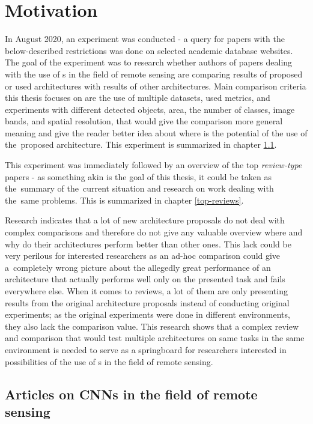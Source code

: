 \chapter{Motivation}
\label{motivation}

In August 2020, an experiment was conducted - a query for papers with the below-described restrictions was done on selected academic database websites. The goal of the experiment was to research whether authors of papers dealing with the use of s in the field of remote sensing are comparing results of proposed or used architectures with results of other architectures. Main comparison criteria this thesis focuses on are the use of multiple datasets, used metrics, and experiments with different detected objects, area, the number of classes, image bands, and spatial resolution, that would give the comparison more general meaning and give the reader better idea about where is the potential of the use of the~proposed architecture. This experiment is summarized in chapter \ref{top-papers}.

This experiment was immediately followed by an overview of the top \textit{review-type} papers - as something akin is the goal of this thesis, it could be taken as the~summary of the~current situation and research on work dealing with the~same problems. This is summarized in chapter \ref{top-reviews}.

Research indicates that a lot of new  architecture proposals do not deal with complex comparisons and therefore do not give any valuable overview where and why do their architectures perform better than other ones. This lack could be very perilous for interested researchers as an ad-hoc comparison could give a~completely wrong picture about the allegedly great performance of an architecture that actually performs well only on the presented task and fails everywhere else. When it comes to reviews, a lot of them are only presenting results from the original architecture proposals instead of conducting original experiments; as the original experiments were done in different environments, they also lack the comparison value. This research shows that a complex review and comparison that would test multiple architectures on same tasks in the same environment is needed to serve as a springboard for researchers interested in possibilities of the use of s in the field of remote sensing.

\section{Articles on CNNs in the field of remote sensing}
\label{top-papers}

